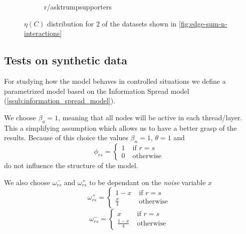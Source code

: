 \begin{figure}
\begin{center}
\begin{subfigure}[b]{0.4\textwidth}
			\caption{r/asktrumpsupporters}
			\label{fig:asktrump-hist-eta}
		\end{subfigure}
	\end{center}
	\caption{$\eta(C)$ distribution for $2$ of the datasets shown in
		\autoref{fig:edge-sum-n-interactions}}
	\label{fig:eta-distribution-content}
\end{figure}

%


\subsection{Tests on synthetic data}%
\label{sub:testing_on_synthetic_data}

For studying how the model behaves in controlled situations we define a
parametrized model based on the Information Spread model
(\autoref{ssub:information_spread_model}).

We choose $\beta _{a} = 1$, meaning that all nodes will be active in each
thread/layer. This a
simplifying assumption which allows us to have a better grasp of the results.
Because of this choice the values $\beta _n = 1$, $\theta = 1$ and
\begin{equation}
	\phi_{rs}  =
	\begin{cases}
		1 \; & \text{if } r = s  \\
		0 \; & \text{otherwise }
	\end{cases}
\end{equation}
do not influence the structure of the model.

We also choose $\omega ^{-} _{rs}$ and $\omega ^{+} _{rs} $ to be dependant on
the \emph{noise} variable $x$
\begin{equation}
	\omega_{rs}^{+}   =
	\begin{cases}
		1 - x \;        & \text{if } r = s  \\
		\frac{x}{4}  \; & \text{otherwise }
	\end{cases}
\end{equation}
\begin{equation}
	\omega_{rs}^{-}   =
	\begin{cases}
		x \;                & \text{if } r = s  \\
		\frac{1 - x}{4}  \; & \text{otherwise }
	\end{cases}
\end{equation}

